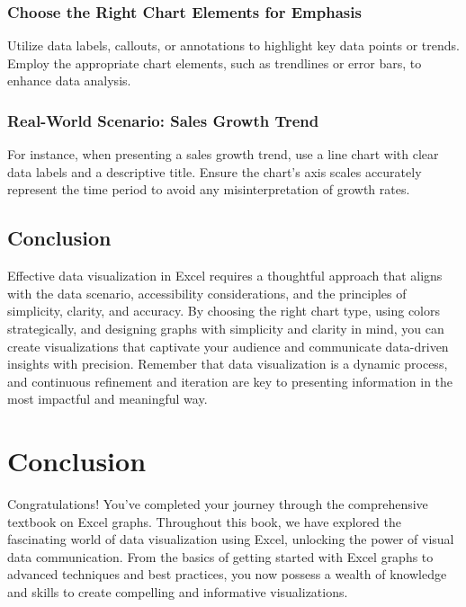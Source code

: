 \documentclass[
]{book}
\begin{document}
\hypertarget{choose-the-right-chart-elements-for-emphasis}{%
\subsection{Choose the Right Chart Elements for Emphasis}\label{choose-the-right-chart-elements-for-emphasis}}

Utilize data labels, callouts, or annotations to highlight key data points or trends.
Employ the appropriate chart elements, such as trendlines or error bars, to enhance data analysis.

\hypertarget{real-world-scenario-sales-growth-trend}{%
\subsection{Real-World Scenario: Sales Growth Trend}\label{real-world-scenario-sales-growth-trend}}

For instance, when presenting a sales growth trend, use a line chart with clear data labels and a descriptive title. Ensure the chart's axis scales accurately represent the time period to avoid any misinterpretation of growth rates.

\hypertarget{conclusion-4}{%
\section{Conclusion}\label{conclusion-4}}

Effective data visualization in Excel requires a thoughtful approach that aligns with the data scenario, accessibility considerations, and the principles of simplicity, clarity, and accuracy. By choosing the right chart type, using colors strategically, and designing graphs with simplicity and clarity in mind, you can create visualizations that captivate your audience and communicate data-driven insights with precision. Remember that data visualization is a dynamic process, and continuous refinement and iteration are key to presenting information in the most impactful and meaningful way.

\hypertarget{conclusion-5}{%
\chapter{Conclusion}\label{conclusion-5}}

Congratulations! You've completed your journey through the comprehensive textbook on Excel graphs. Throughout this book, we have explored the fascinating world of data visualization using Excel, unlocking the power of visual data communication. From the basics of getting started with Excel graphs to advanced techniques and best practices, you now possess a wealth of knowledge and skills to create compelling and informative visualizations.
\end{document}
